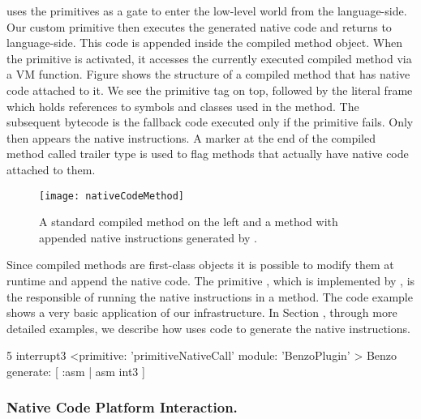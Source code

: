 \B uses the primitives as a gate to enter the low-level world from the language-side.
Our custom primitive then executes the generated native code and returns to language-side. 
This code is appended inside the compiled method object.
When the primitive is activated, it  accesses the currently executed compiled method via a VM function. Figure  shows the structure of a \ST compiled method that has native code attached to it.
We see the primitive tag on top, followed by the literal frame which holds references to symbols and classes used in the method.
The subsequent \ST bytecode is the fallback code executed only if the primitive fails. Only then appears the native instructions.
A marker at the end of the compiled method called trailer type is used to flag methods that actually have native code attached to them.
%
\vspace{-1mm}
\begin{figure}[ht]
	\centering
	\texttt{[image: nativeCodeMethod]}
	\caption{A standard \ST compiled method on the left and a method with appended native instructions generated by \B.}
\end{figure}
\vspace{-3mm}

Since compiled methods are first-class objects it is possible to modify them at runtime and append the native code.
The primitive , which is implemented by \B, is the responsible of running the native instructions in a \ST method.
The code example  shows a very basic application of our infrastructure.
In Section , through more detailed examples, we describe how \B uses \ST code to generate the native instructions.
%
\begin{stcode}[label={lst:basic-native-code}, caption={\ST method using \B for very basic low-level debugging.}, escapeinside={@}{@}]{5}
interrupt3
	<primitive: 'primitiveNativeCall' 
	 module: 'BenzoPlugin' >
	Benzo generate: [ :asm | asm int3 ]
\end{stcode}
\vspace{-5mm}

\subsubsection{Native Code Platform Interaction.}

